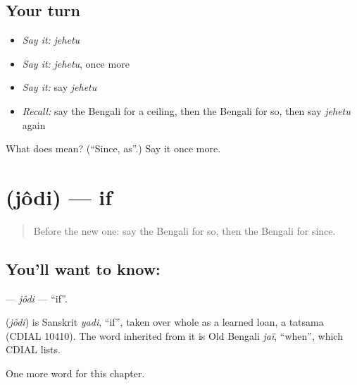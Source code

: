 \subsection*{Your turn}
\begin{itemize}
\raggedright
  \item \emph{Say it:} \emph{jehetu}
  \item \emph{Say it:} \emph{jehetu}, once more
  \item \emph{Say it:} say \emph{jehetu}
  \item \emph{Recall:} say the Bengali for a ceiling, then the Bengali for so, then say \emph{jehetu} again
\end{itemize}

\begin{tcolorbox}[breakable,colback=teal!4,colframe=teal!35!black,title={Before you move on}]
What does  mean? (\textquotedblleft{}Since, as\textquotedblright{}.) Say it once more.
\end{tcolorbox}
\section[\texorpdfstring{\bn{যদি} (jôdi)}{যদি (jôdi)}]{ (jôdi) — if}

\label{lesson:BN-C159-jodi}



\begin{quote}
Before the new one: say the Bengali for so, then the Bengali for since.
\end{quote}

\subsection*{You'll want to know: }
\textbf{} — \emph{jôdi} — \textquotedblleft{}if\textquotedblright{}.

\begin{cousinweb}
\textbf{} (\emph{jôdi}) is Sanskrit \emph{yadi}, \textquotedblleft{}if\textquotedblright{}, taken over whole as a learned loan, a tatsama (CDIAL 10410). The word inherited from it is Old Bengali \emph{jaï}, \textquotedblleft{}when\textquotedblright{}, which CDIAL lists.
\end{cousinweb}

\begin{grammarlens}[title={What you've built}]
One more word for this chapter.
\end{grammarlens}

